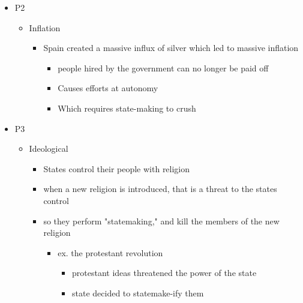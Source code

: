 \documentclass[letterpaper]{article}
\begin{document}
\begin{enumerate}
\begin{itemize}
\item P2

\begin{itemize}
\item Inflation

\begin{itemize}
\item Spain created a massive influx of silver which led to massive
inflation

\begin{itemize}
\item people hired by the government can no longer be paid off
\item Causes efforts at autonomy
\item Which requires state-making to crush
\end{itemize}
\end{itemize}
\end{itemize}

\item P3

\begin{itemize}
\item Ideological

\begin{itemize}
\item States control their people with religion
\item when a new religion is introduced, that is a threat to the states
control
\item so they perform "statemaking," and kill the members of the new
religion

\begin{itemize}
\item ex. the protestant revolution

\begin{itemize}
\item protestant ideas threatened the power of the state
\item state decided to statemake-ify them
\end{itemize}
\end{itemize}
\end{itemize}
\end{itemize}
\end{itemize}
\end{enumerate}
\end{document}
